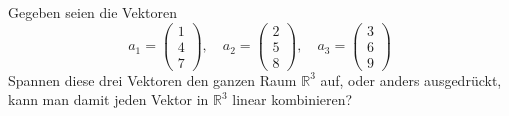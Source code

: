 \begin{beispiel}
Gegeben seien die Vektoren
\[
a_1=\begin{pmatrix}1\\4\\7\end{pmatrix},\quad
a_2=\begin{pmatrix}2\\5\\8\end{pmatrix},\quad
a_3=\begin{pmatrix}3\\6\\9\end{pmatrix}
\]
Spannen diese drei Vektoren den ganzen Raum $\mathbb R^3$ auf,
oder anders ausgedrückt, kann man damit jeden Vektor in $\mathbb R^3$
linear kombinieren?


\end{beispiel}
